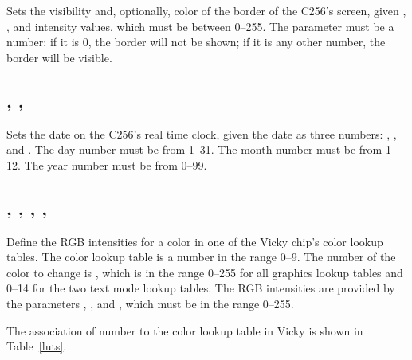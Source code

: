 \documentclass{report}
\begin{document}
    Sets the visibility and, optionally, color of the border of the C256's screen, given
    , , and  intensity values, which must be
    between 0--255.
    The parameter  must be a number: if it is 0, the border
    will not be shown; if it is any other number, the border will be visible.

    \subsection*{ , , }

    Sets the date on the C256's real time clock, given the date as three numbers:
    , , and .
    The day number must be from 1--31.
    The month number must be from 1--12.
    The year number must be from 0--99.

    \subsection*{ , , , , }

    Define the RGB intensities for a color in one of the Vicky chip's color lookup tables.
    The color lookup table is a number  in the range 0--9.
    The number of the color to change is , which is in the range 0--255 for all graphics lookup tables
    and 0--14 for the two text mode lookup tables.
    The RGB intensities are provided by the parameters , , and , which 
    must be in the range 0--255.

    The association of  number to the color lookup table in Vicky
    is shown in Table~\ref{luts}.
\end{document}
